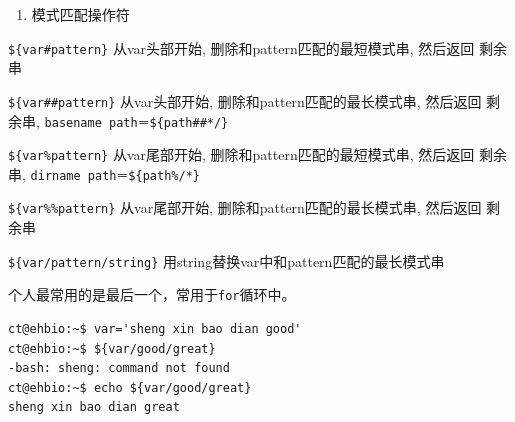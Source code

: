 \documentclass[]{article}
\newenvironment{Shaded}{\begin{snugshade}}{\end{snugshade}}
\newcommand{\ExtensionTok}[1]{#1}
\newcommand{\NormalTok}[1]{#1}
\newcommand{\StringTok}[1]{\textcolor[rgb]{0.31,0.60,0.02}{#1}}
\newcommand{\VariableTok}[1]{\textcolor[rgb]{0.00,0.00,0.00}{#1}}
\providecommand{\tightlist}{%
  \setlength{\itemsep}{0pt}\setlength{\parskip}{0pt}}
\numberwithin{figure}{section}
\numberwithin{table}{section}
\begin{document}
\begin{Shaded}
\end{Shaded}

\begin{enumerate}
\def\labelenumi{\arabic{enumi}.}
\setcounter{enumi}{1}
\tightlist
\item
  模式匹配操作符
\end{enumerate}

\texttt{\$\{var\#pattern\}} 从var头部开始, 删除和pattern匹配的最短模式串, 然后返回 剩余串

\texttt{\$\{var\#\#pattern\}} 从var头部开始, 删除和pattern匹配的最长模式串, 然后返回 剩余串, \texttt{basename\ path＝\$\{path\#\#*/\}}

\texttt{\$\{var\%pattern\}} 从var尾部开始, 删除和pattern匹配的最短模式串, 然后返回 剩余串, \texttt{dirname\ path＝\$\{path\%/*\}}

\texttt{\$\{var\%\%pattern\}} 从var尾部开始, 删除和pattern匹配的最长模式串, 然后返回 剩余串

\texttt{\$\{var/pattern/string\}} 用string替换var中和pattern匹配的最长模式串

个人最常用的是最后一个，常用于\texttt{for}循环中。

\begin{verbatim}
ct@ehbio:~$ var='sheng xin bao dian good'
ct@ehbio:~$ ${var/good/great}
-bash: sheng: command not found
ct@ehbio:~$ echo ${var/good/great}
sheng xin bao dian great
\end{verbatim}
\end{document}
